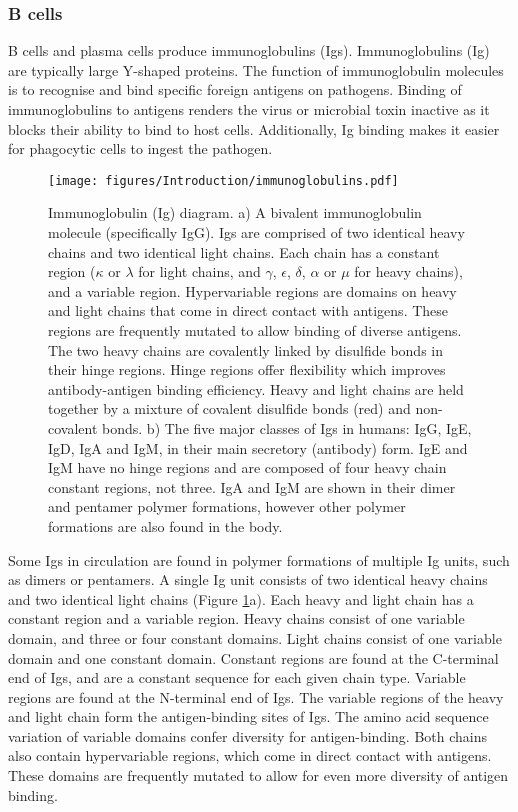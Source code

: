 \subsubsection{B cells}
B cells and plasma cells produce immunoglobulins (Igs).
Immunoglobulins (Ig) are typically large Y-shaped proteins.
The function of immunoglobulin molecules is to recognise and bind specific foreign antigens on pathogens.
Binding of immunoglobulins to antigens renders the virus or microbial toxin inactive as it blocks their ability to bind to host cells.
Additionally, Ig binding makes it easier for phagocytic cells to ingest the pathogen\cite{alberts2007molecularimmune}.
\begin{figure}[htb]
\centering\texttt{[image: figures/Introduction/immunoglobulins.pdf]}
\caption[Immunoglobulins]{Immunoglobulin (Ig) diagram.
a) A bivalent immunoglobulin molecule (specifically IgG).
Igs are comprised of two identical heavy chains and two identical light chains.
Each chain has a constant region ($\kappa$ or $\lambda$ for light chains, and $\gamma$, $\epsilon$, $\delta$, $\alpha$ or $\mu$ for heavy chains), and a variable region.
Hypervariable regions are domains on heavy and light chains that come in direct contact with antigens.
These regions are frequently mutated to allow binding of diverse antigens.
The two heavy chains are covalently linked by disulfide bonds in their hinge regions.
Hinge regions offer flexibility which improves antibody-antigen binding efficiency.
Heavy and light chains are held together by a mixture of covalent disulfide bonds (red) and non-covalent bonds.
b) The five major classes of Igs in humans: IgG, IgE, IgD, IgA and IgM, in their main secretory (antibody) form.
IgE and IgM have no hinge regions and are composed of four heavy chain constant regions, not three.
IgA and IgM are shown in their dimer and pentamer polymer formations, however other polymer formations are also found in the body.}
\label{fig:immunoglobulins_diagram}\end{figure}

Some Igs in circulation are found in polymer formations of multiple Ig units, such as dimers or pentamers.
A single Ig unit consists  of two identical heavy chains and two identical light chains (Figure \ref{fig:immunoglobulins_diagram}a).
Each heavy and light chain has a constant region and a variable region.
Heavy chains consist of one variable domain, and three or four constant domains.
Light chains consist of one variable domain and one constant domain.
Constant regions are found at the C-terminal end of Igs, and are a constant sequence for each given chain type.
Variable regions are found at the N-terminal end of Igs.
The variable regions of the heavy and light chain form the antigen-binding sites of Igs.
The amino acid sequence variation of variable domains confer diversity for antigen-binding.
Both chains also contain hypervariable regions, which come in direct contact with antigens.
These domains are frequently mutated to allow for even more diversity of antigen binding\cite{schroeder2010structure}.

